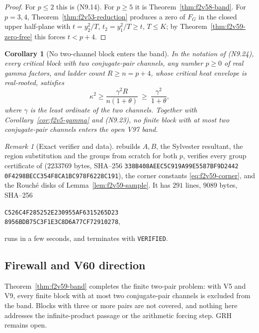 \documentclass[11pt]{article}
\newtheorem{corollary}[theorem]{Corollary}
\theoremstyle{definition}
\theoremstyle{remark}
\newtheorem{remark}[theorem]{Remark}
\begin{document}
\begin{proof}
For \(p\le2\) this is \textup{(N9.14)}.  For \(p\ge5\) it is
Theorem~\ref{thm:f2v58-band}.  For \(p=3,4\), Theorem~\ref{thm:f2v53-reduction}
produces a zero of \(F_G\) in the closed upper half-plane with
\(t=y_2^2/T\), \(t_2=y_1^2/T\ge t\), \(T\le K\); by
Theorem~\ref{thm:f2v59-zero-free} this forces \(t<p+4\).
\end{proof}

\begin{corollary}[No two-channel block enters the band]
\label{cor:f2v59-gamma}
In the notation of \textup{(N9.24)}, every critical block with two
conjugate-pair channels, any number \(p\ge0\) of real gamma factors, and
ladder count \(R\ge n=p+4\), whose critical heat envelope is
real-rooted, satisfies
\begin{equation}
 \boxed{\;\kappa^2\ge\frac{\gamma^2R}{n(1+\theta)}\ \ge\ \frac{\gamma^2}{1+\theta},\;}
 \label{eq:f2v59-gamma}
\end{equation}
where \(\gamma\) is the least ordinate of the two channels.  Together
with Corollary~\ref{cor:f2v5-gamma} and \textup{(N9.23)}, no finite block
with at most two conjugate-pair channels enters the open V97 band.
\end{corollary}

\begin{remark}[Exact verifier and data]
\label{rem:f2v59-verifier}
 rebuilds \(A,B\), the
Sylvester resultant, the region substitution and the groups from
scratch for both \(p\), verifies every group certificate of
(\(2233769\) bytes, SHA--256
\texttt{338B408AEEC5C919A99E5587BF9D2442}\allowbreak
\texttt{0F4298BECC354F8CA1BC978F6228C191}), the corner constants
\eqref{eq:f2v59-corner}, and the Rouch\'{e} disks of
Lemma~\ref{lem:f2v59-sample}.  It has \(291\) lines, \(9089\) bytes,
SHA--256
\begin{center}
\texttt{C526C4F285252E230955AF6315265D23}\\
\texttt{8956BDB75C3F1E3C8D6A77CF72910278},
\end{center}
runs in a few seconds, and terminates with \texttt{VERIFIED}.
\end{remark}

\subsection*{Firewall and V60 direction}
\label{fire:f2v59}
Theorem~\ref{thm:f2v59-band} completes the finite two-pair problem: with
V5 and V9, every finite block with at most two conjugate-pair channels is
excluded from the band.  Blocks with three or more pairs are not covered,
and nothing here addresses the infinite-product passage or the
arithmetic forcing step.  GRH remains open.
\end{document}
